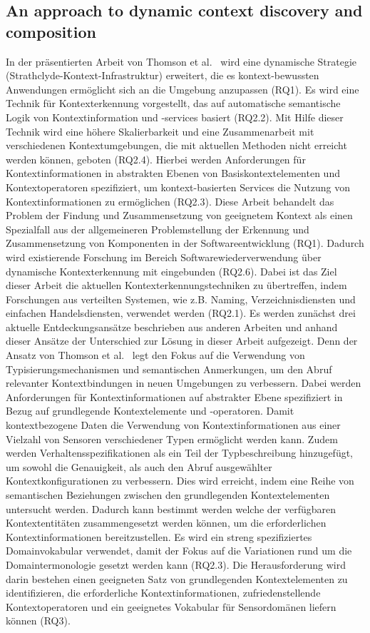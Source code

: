 \documentclass[conference,compsoc]{IEEEtran}
\begin{document}
\subsection{An approach to dynamic context discovery and composition}
In der präsentierten Arbeit von Thomson et al.~\cite{thomson2003approach} wird eine dynamische Strategie (Strathclyde-Kontext-Infrastruktur) erweitert, die es kontext-bewussten Anwendungen ermöglicht sich an die Umgebung anzupassen (RQ1). Es wird eine Technik für Kontexterkennung vorgestellt, das auf automatische semantische Logik von Kontextinformation und -services basiert (RQ2.2). Mit Hilfe dieser Technik wird eine höhere Skalierbarkeit und eine Zusammenarbeit mit verschiedenen Kontextumgebungen, die mit aktuellen Methoden nicht erreicht werden können, geboten (RQ2.4). Hierbei werden Anforderungen für Kontextinformationen in abstrakten Ebenen von Basiskontextelementen und Kontextoperatoren spezifiziert, um kontext-basierten Services die Nutzung von Kontextinformationen zu ermöglichen (RQ2.3). Diese Arbeit behandelt das Problem der Findung und Zusammensetzung von geeignetem Kontext als einen Spezialfall aus der allgemeineren Problemstellung der Erkennung und Zusammensetzung von Komponenten in der Softwareentwicklung (RQ1). Dadurch wird existierende Forschung im Bereich Softwarewiederverwendung über dynamische Kontexterkennung mit eingebunden (RQ2.6). Dabei ist das Ziel dieser Arbeit die aktuellen Kontexterkennungstechniken zu übertreffen, indem Forschungen aus verteilten Systemen, wie z.B. Naming, Verzeichnisdiensten und einfachen Handelsdiensten, verwendet werden (RQ2.1). Es werden zunächst drei aktuelle Entdeckungsansätze beschrieben aus anderen Arbeiten und anhand dieser Ansätze der Unterschied zur Lösung in dieser Arbeit aufgezeigt. Denn der Ansatz von Thomson et al.~\cite{thomson2003approach} legt den Fokus auf die Verwendung von Typisierungsmechanismen und semantischen Anmerkungen, um den Abruf relevanter Kontextbindungen in neuen Umgebungen zu verbessern. Dabei werden Anforderungen für Kontextinformationen auf abstrakter Ebene spezifiziert in Bezug auf grundlegende Kontextelemente und -operatoren. Damit kontextbezogene Daten die Verwendung von Kontextinformationen aus einer Vielzahl von Sensoren verschiedener Typen ermöglicht werden kann. Zudem werden Verhaltensspezifikationen als ein Teil der Typbeschreibung hinzugefügt, um sowohl die Genauigkeit, als auch den Abruf ausgewählter Kontextkonfigurationen zu verbessern. Dies wird erreicht, indem eine Reihe von semantischen Beziehungen zwischen den grundlegenden Kontextelementen untersucht werden. Dadurch kann bestimmt werden welche der verfügbaren Kontextentitäten zusammengesetzt werden können, um die erforderlichen Kontextinformationen bereitzustellen. Es wird ein streng spezifiziertes Domainvokabular verwendet, damit der Fokus auf die Variationen rund um die Domaintermonologie gesetzt werden kann (RQ2.3). Die Herausforderung wird darin bestehen einen geeigneten Satz von grundlegenden Kontextelementen zu identifizieren, die erforderliche Kontextinformationen, zufriedenstellende Kontextoperatoren und ein geeignetes Vokabular für Sensordomänen liefern können (RQ3).
\end{document}
